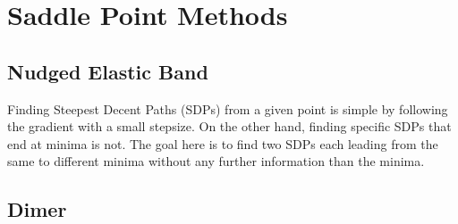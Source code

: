 \section{Saddle Point Methods}
\label{sec:sps}

\placeholder

\subsection{Nudged Elastic Band}
\label{sec:neb}

Finding Steepest Decent Paths (SDPs) from a given point is simple by following the gradient with a small stepsize.
On the other hand, finding specific SDPs that end at minima is not.
The goal here is to find two SDPs each leading from the same  to different minima without any further information than the minima.



\placeholder

\subsection{Dimer}
\label{sec:dimer}

\placeholder
